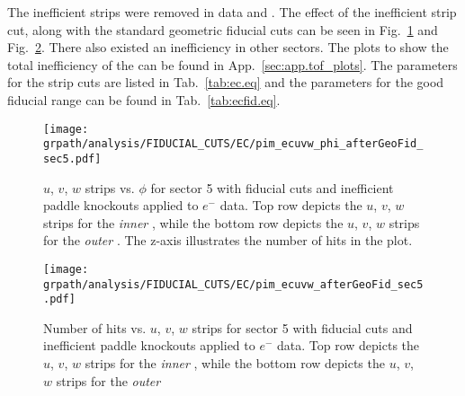 The inefficient strips were removed in data and . The effect of the inefficient strip cut, along with the standard   geometric fiducial cuts can be seen in Fig.~\ref{fig:neg:ec.sec5_cut} and Fig.~\ref{fig:neg.ecstrip.sec5_cut}.
%
There also existed an inefficiency in other sectors. The plots to show the total inefficiency of the  can be found in App.~\ref{sec:app.tof_plots}. The parameters for the  strip cuts are listed in Tab.~\ref{tab:ec.eq} and the parameters for the good  fiducial range can be found in Tab.~\ref{tab:ecfid.eq}.
  
  

\begin{figure}[h!]\begin{center}
\texttt{[image: \\grpath/analysis/FIDUCIAL\_CUTS/EC/pim\_ecuvw\_phi\_afterGeoFid\_sec5.pdf]}
\caption[ $u$, $v$, $w$ strips vs. $\phi$ for sector 5 with fiducial cuts and inefficient paddle knockouts applied to $e^-$ data]{\label{fig:neg:ec.sec5_cut}  $u$, $v$, $w$ strips vs. $\phi$ for sector 5 with fiducial cuts and inefficient paddle knockouts applied to $e^-$ data. Top row depicts the $u$, $v$, $w$ strips for the \emph{inner} , while the bottom row depicts the $u$, $v$, $w$ strips for the \emph{outer} . The z-axis illustrates the number of hits in the plot.}
\end{center}\end{figure}
%
\begin{figure}[h!]\begin{center}
\texttt{[image: \\grpath/analysis/FIDUCIAL\_CUTS/EC/pim\_ecuvw\_afterGeoFid\_sec5.pdf]}
\caption[Number of hits vs.  $u$, $v$, $w$ strips for sector 5 with fiducial cuts and inefficient paddle knockouts applied to $e^-$ data]{\label{fig:neg.ecstrip.sec5_cut}Number of hits vs.  $u$, $v$, $w$ strips for sector 5 with fiducial cuts and inefficient paddle knockouts applied to $e^-$ data. Top row depicts the $u$, $v$, $w$ strips for the \emph{inner} , while the bottom row depicts the $u$, $v$, $w$ strips for the \emph{outer} }
\end{center}\end{figure}

\FloatBarrier